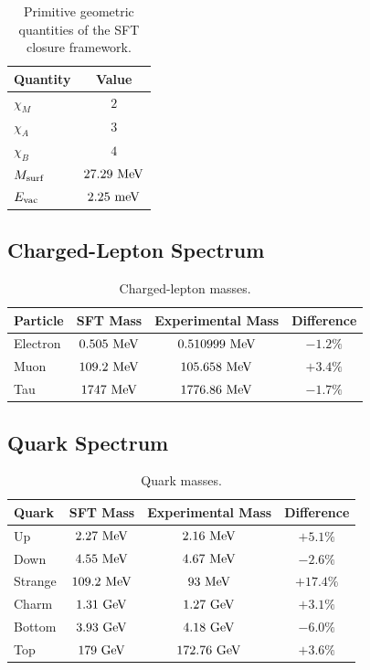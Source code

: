 \documentclass[11pt]{article}
\theoremstyle{definition}
\theoremstyle{remark}
\begin{document}
\begin{table}[H]
\centering
\caption{Primitive geometric quantities of the SFT closure framework.}
\begin{tabular}{lc}
\toprule
Quantity & Value \\
\midrule
$\chi_M$ & $2$ \\
$\chi_A$ & $3$ \\
$\chi_B$ & $4$ \\
$M_{\rm surf}$ & $27.29~{\rm MeV}$ \\
$E_{\rm vac}$ & $2.25~{\rm meV}$ \\
\bottomrule
\end{tabular}
\end{table}


\subsection{Charged-Lepton Spectrum}

\begin{table}[H]
\centering
\caption{Charged-lepton masses.}
\begin{tabular}{lccc}
\toprule
Particle & SFT Mass & Experimental Mass & Difference \\
\midrule
Electron & $0.505~{\rm MeV}$ & $0.510999~{\rm MeV}$ & $-1.2\%$ \\
Muon & $109.2~{\rm MeV}$ & $105.658~{\rm MeV}$ & $+3.4\%$ \\
Tau & $1747~{\rm MeV}$ & $1776.86~{\rm MeV}$ & $-1.7\%$ \\
\bottomrule
\end{tabular}
\end{table}


\subsection{Quark Spectrum}

\begin{table}[H]
\centering
\caption{Quark masses.}
\begin{tabular}{lccc}
\toprule
Quark & SFT Mass & Experimental Mass & Difference \\
\midrule
Up & $2.27~{\rm MeV}$ & $2.16~{\rm MeV}$ & $+5.1\%$ \\
Down & $4.55~{\rm MeV}$ & $4.67~{\rm MeV}$ & $-2.6\%$ \\
Strange & $109.2~{\rm MeV}$ & $93~{\rm MeV}$ & $+17.4\%$ \\
Charm & $1.31~{\rm GeV}$ & $1.27~{\rm GeV}$ & $+3.1\%$ \\
Bottom & $3.93~{\rm GeV}$ & $4.18~{\rm GeV}$ & $-6.0\%$ \\
Top & $179~{\rm GeV}$ & $172.76~{\rm GeV}$ & $+3.6\%$ \\
\bottomrule
\end{tabular}
\end{table}
\end{document}
